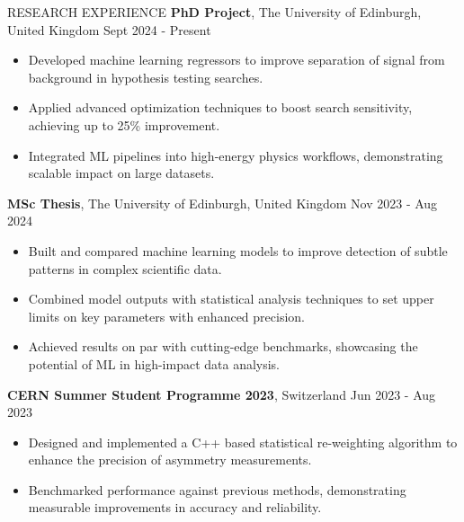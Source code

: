 \documentclass{resume} %
\begin{document}
        \begin{rSection}{RESEARCH EXPERIENCE}
                \textbf{PhD Project}, The University of Edinburgh, United Kingdom \hfill Sept 2024 - Present\\
                \vspace{-1.5em}
                \begin{itemize}
                        \itemsep -2pt {}
                        \item Developed machine learning regressors to improve separation of signal from background in hypothesis testing searches.
                        \item Applied advanced optimization techniques to boost search sensitivity, achieving up to 25\% improvement.
                        \item Integrated ML pipelines into high-energy physics workflows, demonstrating scalable impact on large datasets.
                \end{itemize}

                \textbf{MSc Thesis}, The University of Edinburgh, United Kingdom \hfill Nov 2023 - Aug 2024\\
                \vspace{-1.5em}
                \begin{itemize}
                        \itemsep -2pt {}
                        \item Built and compared machine learning models to improve detection of subtle patterns in complex scientific data.
                        \item Combined model outputs with statistical analysis techniques to set upper limits on key parameters with enhanced precision.
                        \item Achieved results on par with cutting-edge benchmarks, showcasing the potential of ML in high-impact data analysis.
                \end{itemize}

                \textbf{CERN Summer Student Programme 2023}, Switzerland  \hfill Jun 2023 - Aug 2023\\
                \vspace{-1.5em}
                \begin{itemize}
                        \itemsep -2pt {}
                        \item Designed and implemented a C++ based statistical re-weighting algorithm to enhance the precision of asymmetry measurements.
                        \item Benchmarked performance against previous methods, demonstrating measurable improvements in accuracy and reliability.
                \end{itemize}


\end{rSection}
\end{document}
